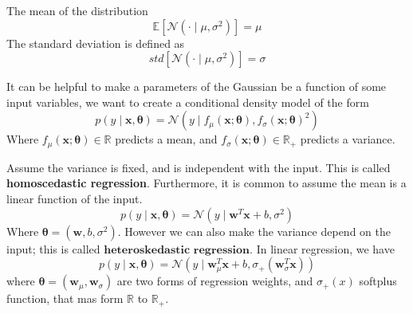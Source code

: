 \documentclass[10pt,landscape]{article}
\newcommand{\mean}{\mathbb{E}}
\newcommand{\inp}{\textbf{x}}
\newcommand{\parameter}{\boldsymbol{\theta}}
\newcommand{\R}{\mathbb{R}}
\newcommand{\variance}{\sigma^2}
\newcommand{\normal}{\mathcal{N}}
\newcommand{\weight}{\mathbf{w}}
\newcommand{\softplus}[1]{\sigma_+(#1)}
\begin{document}
\begin{multicols*}{3}
The mean of the distribution
\[\mean[\normal(\cdot\mid\mu,\variance)]=\mu\]
The standard deviation is defined as
\[std[\normal(\cdot\mid\mu,\variance)]=\sigma\]

It can be helpful to make a parameters of the Gaussian be a function of some input variables, we want to create a conditional density model of the form
\[
    p(y\mid\inp,\parameter)=\normal(y\mid f_{\mu}(\inp;\parameter),f_{\sigma}(\inp;\parameter)^2)
\]
Where $f_{\mu}(\inp;\parameter)\in\R$ predicts a mean, and $f_{\sigma}(\inp;\parameter)\in\R_+$ predicts a variance.

Assume the variance is fixed, and is independent with the input. This is called \textbf{homoscedastic regression}. Furthermore, it is common to assume the mean is a linear function of the input.
\[
    p(y\mid\inp,\parameter)=\normal(y\mid \weight^T\inp+b,\variance)
\]
Where $\parameter=(\weight,b,\variance)$. However we can also make the variance depend on the input; this is called $\textbf{heteroskedastic regression}$. In linear regression, we have
\[
    p(y\mid\inp,\parameter)=\normal(y\mid \weight_{\mu}^T\inp+b,\sigma_+(\weight_\sigma^T\inp))
\]
where $\parameter=(\weight_{\mu},\weight_\sigma)$ are two forms of regression weights, and $\softplus{x}$ softplus function, that mas form $\R$ to $\R_+$.
\end{multicols*}
\end{document}
